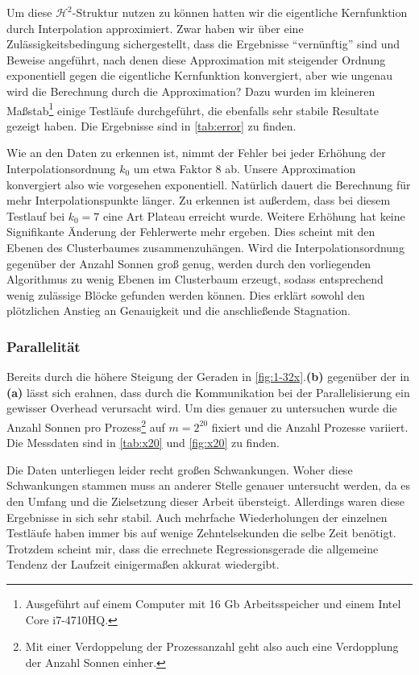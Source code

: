   Um diese $\mathcal{H}^2$-Struktur nutzen zu können hatten wir die eigentliche Kernfunktion durch Interpolation approximiert. Zwar haben wir über eine Zulässigkeitsbedingung sichergestellt, dass die 
  Ergebnisse ``vernünftig'' sind und Beweise angeführt, nach denen diese Approximation mit steigender Ordnung exponentiell gegen die eigentliche Kernfunktion konvergiert, aber wie ungenau wird die
  Berechnung durch die Approximation? Dazu wurden im kleineren Maßstab\footnote{Ausgeführt auf einem Computer mit 16 Gb Arbeitsspeicher und einem Intel Core i7-4710HQ.} einige Testläufe durchgeführt, 
  die ebenfalls sehr stabile Resultate gezeigt haben. Die Ergebnisse sind in \autoref{tab:error} zu finden.
  
  Wie an den Daten zu erkennen ist, nimmt der Fehler bei jeder Erhöhung der Interpolationsordnung $k_0$ um etwa Faktor $8$ ab. Unsere Approximation konvergiert also wie vorgesehen exponentiell. Natürlich
  dauert die Berechnung für mehr Interpolationspunkte länger. Zu erkennen ist außerdem, dass bei diesem Testlauf bei $k_0=7$ eine Art Plateau erreicht wurde. Weitere Erhöhung hat keine Signifikante
  Änderung der Fehlerwerte mehr ergeben. Dies scheint mit den Ebenen des Clusterbaumes zusammenzuhängen. Wird die Interpolationsordnung gegenüber der Anzahl Sonnen groß genug, werden durch den
  vorliegenden Algorithmus zu wenig Ebenen im Clusterbaum erzeugt, sodass entsprechend wenig zulässige Blöcke gefunden werden können. Dies erklärt sowohl den plötzlichen Anstieg an Genauigkeit und
  die anschließende Stagnation.
  
  \subsubsection{Parallelität}
  
  Bereits durch die höhere Steigung der Geraden in \autoref{fig:1-32x}.\textbf{(b)} gegenüber der in \textbf{(a)} lässt sich erahnen, dass durch die Kommunikation bei der Parallelisierung ein gewisser
  Overhead verursacht wird. Um dies genauer zu untersuchen wurde die Anzahl Sonnen pro Prozess\footnote{Mit einer Verdoppelung der Prozessanzahl geht also auch eine Verdopplung der Anzahl Sonnen 
  einher.} auf $m = 2^{20}$ fixiert und die Anzahl Prozesse variiert.  Die Messdaten sind in \autoref{tab:x20} und \autoref{fig:x20} zu finden. 
  
  Die Daten unterliegen leider recht großen Schwankungen. Woher diese Schwankungen stammen muss an anderer Stelle genauer untersucht werden, da es den Umfang und die Zielsetzung dieser Arbeit 
  übersteigt. Allerdings waren diese Ergebnisse in sich sehr stabil. Auch mehrfache Wiederholungen der einzelnen Testläufe haben immer bis auf wenige Zehntelsekunden die selbe Zeit benötigt. 
   Trotzdem scheint mir, dass die errechnete Regressionsgerade die allgemeine Tendenz der Laufzeit einigermaßen akkurat wiedergibt.
  
